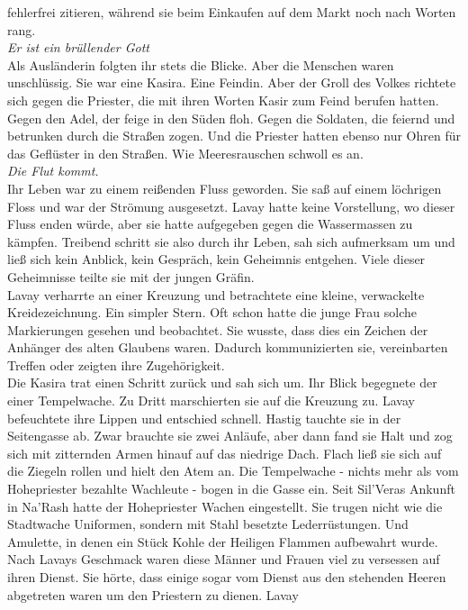 fehlerfrei zitieren, während sie beim Einkaufen auf dem Markt noch nach Worten rang.\\
\textit{Er ist ein brüllender Gott}\\
Als Ausländerin folgten ihr stets die Blicke. Aber die Menschen waren unschlüssig. Sie war eine 
Kasira. Eine Feindin. Aber der Groll des Volkes richtete sich gegen die Priester, die mit ihren 
Worten Kasir zum Feind berufen hatten. Gegen den Adel, der feige in den Süden floh. Gegen die 
Soldaten, die feiernd und betrunken durch die Straßen zogen. Und die Priester hatten ebenso nur 
Ohren für das Geflüster in den Straßen. Wie Meeresrauschen schwoll es an.\\
\textit{Die Flut kommt.}\\
Ihr Leben war zu einem reißenden Fluss geworden. Sie saß auf einem löchrigen Floss und war der 
Strömung ausgesetzt. Lavay hatte keine Vorstellung, wo dieser Fluss enden würde, aber sie hatte 
aufgegeben gegen die Wassermassen zu kämpfen. Treibend schritt sie also durch ihr Leben, sah sich 
aufmerksam um und ließ sich kein Anblick, kein Gespräch, kein Geheimnis entgehen. Viele dieser 
Geheimnisse teilte sie mit der jungen Gräfin.\\
Lavay verharrte an einer Kreuzung und betrachtete eine kleine, verwackelte Kreidezeichnung. Ein 
simpler Stern. Oft schon hatte die junge Frau solche Markierungen gesehen und beobachtet. Sie 
wusste, dass dies ein Zeichen der Anhänger des alten Glaubens waren. Dadurch kommunizierten sie, 
vereinbarten Treffen oder zeigten ihre Zugehörigkeit.\\
Die Kasira trat einen Schritt zurück und sah sich um. Ihr Blick begegnete der einer Tempelwache. Zu 
Dritt marschierten sie auf die Kreuzung zu. Lavay befeuchtete ihre Lippen und entschied schnell. 
Hastig tauchte sie in der Seitengasse ab. Zwar brauchte sie zwei Anläufe, aber dann fand sie Halt 
und zog sich mit zitternden Armen hinauf auf das niedrige Dach. Flach ließ sie sich auf die Ziegeln 
rollen und hielt den Atem an. Die Tempelwache - nichts mehr als vom Hohepriester bezahlte Wachleute 
- bogen in die Gasse ein. Seit Sil'Veras Ankunft in Na'Rash hatte der Hohepriester Wachen 
eingestellt. Sie trugen nicht wie die Stadtwache Uniformen, sondern mit Stahl besetzte 
Lederrüstungen. Und Amulette, in denen ein Stück Kohle der Heiligen Flammen aufbewahrt wurde. Nach 
Lavays Geschmack waren diese Männer und Frauen viel zu versessen auf ihren Dienst. Sie hörte, dass 
einige sogar vom Dienst aus den stehenden Heeren abgetreten waren um den Priestern zu dienen. Lavay 
